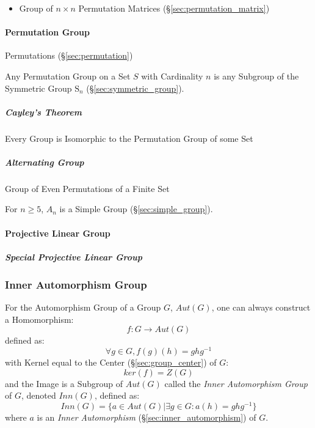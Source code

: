 \begin{itemize}
  \item Group of $n \times n$ Permutation Matrices
    (\S\ref{sec:permutation_matrix})
\end{itemize}



\paragraph{Permutation Group}\label{sec:permutation_group}\hfill

Permutations (\S\ref{sec:permutation})

Any Permutation Group on a Set $S$ with Cardinality $n$ is any
Subgroup of the Symmetric Group $\mathrm{S}_n$
(\S\ref{sec:symmetric_group}).



\subparagraph{Cayley's Theorem}\label{sec:cayleys_theorem}\hfill

Every Group is Isomorphic to the Permutation Group of some Set



\subparagraph{Alternating Group}\label{sec:alternating_group}\hfill

Group of Even Permutations of a Finite Set

For $n \geq 5$, $A_n$ is a Simple Group (\S\ref{sec:simple_group}).



\paragraph{Projective Linear Group}\label{sec:projective_linear_group}\hfill

\subparagraph{Special Projective Linear Group}
\label{sec:special_projective_linear_group}\hfill




\subsubsection{Inner Automorphism Group}\label{sec:inner_automorphism_group}

For the Automorphism Group of a Group $G$, $Aut(G)$, one can always
construct a Homomorphism:
\[
    f : G \rightarrow Aut(G)
\]
defined as:
\[
    \forall g \in G, f (g) (h) = g h g^{-1}
\]
with Kernel equal to the Center (\S\ref{sec:group_center}) of $G$:
\[
    ker(f) = Z(G)
\]
and the Image is a Subgroup of $Aut(G)$ called the \emph{Inner
  Automorphism Group} of $G$, denoted $Inn(G)$, defined as:
\[
    Inn(G) = \{ a \in Aut(G) | \exists g \in G : a(h) = g h g^{-1} \}
\]
where $a$ is an \emph{Inner Automorphism}
(\S\ref{sec:inner_automorphism}) of $G$.

